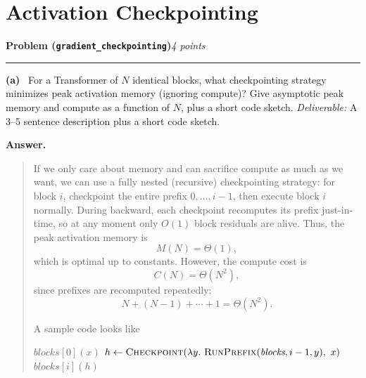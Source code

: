 \documentclass[11pt]{article}
\newcommand{\problem}[2]{%
  \vspace{0.6em}%
  \noindent\textbf{Problem (\texttt{#1})}\hfill\textit{#2 points}\par%
  \vspace{0.2em}\hrule\vspace{0.4em}%
}
\newcommand{\subq}[1]{\vspace{0.3em}\noindent\textbf{(#1)}\ }
\newcommand{\deliverable}[1]{\vspace{0.2em}\noindent\textit{Deliverable:} #1\par}
\newenvironment{answer}{%
  \vspace{0.3em}%
  \noindent\textbf{Answer.}\begin{quote}%
}{%
  \end{quote}\vspace{0.4em}%
}
\begin{document}
\section{Activation Checkpointing}

\problem{gradient\_checkpointing}{4}

\subq{a} For a Transformer of $N$ identical blocks, what checkpointing strategy minimizes peak activation memory (ignoring compute)? Give asymptotic peak memory and compute as a function of $N$, plus a short code sketch.
\deliverable{A 3--5 sentence description plus a short code sketch.}
\begin{answer}
  If we only care about memory and can sacrifice compute as much as we want, we can use a fully nested (recursive) checkpointing strategy: for block $i$, checkpoint the entire prefix $0,\dots,i-1$, then execute block $i$ normally. During backward, each checkpoint recomputes its prefix just-in-time, so at any moment only $O(1)$ block residuals are alive.
  Thus, the peak activation memory is
  \[
  M(N) = \Theta(1),
  \]
  which is optimal up to constants. However, the compute cost is
  \[
  C(N) = \Theta(N^2),
  \]
  since prefixes are recomputed repeatedly:
  \[
  N + (N-1) + \cdots + 1 = \Theta(N^2).
  \]

  A sample code looks like
\begin{algorithm}[H]
\caption{Recursive checkpointed prefix evaluation}
\begin{algorithmic}[1]
    \State \Return $\textit{blocks}[0](x)$
  \EndIf
  \State $h \gets \textsc{Checkpoint}(\lambda y.\ \textsc{RunPrefix}(\textit{blocks}, i-1, y),\ x)$
  \State \Return $\textit{blocks}[i](h)$
\EndProcedure
\end{algorithmic}
\end{algorithm}
\end{answer}
\end{document}
